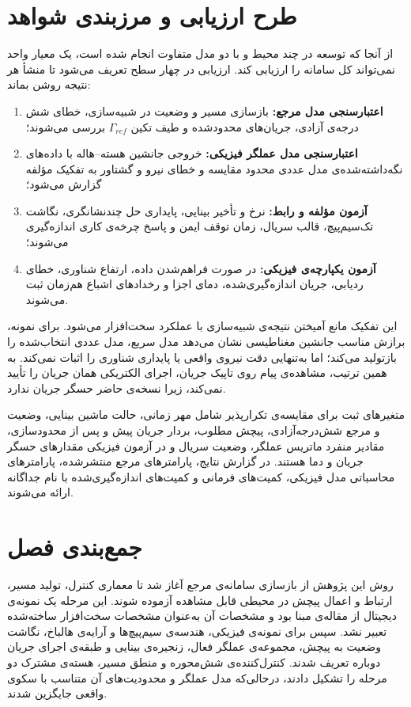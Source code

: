 \section{طرح ارزیابی و مرزبندی شواهد}
\label{sec:method-evaluation-plan}

از آنجا که توسعه در چند محیط و با دو مدل متفاوت انجام شده است، یک معیار واحد نمی‌تواند کل سامانه را ارزیابی کند. ارزیابی در چهار سطح تعریف می‌شود تا منشأ هر نتیجه روشن بماند:

\begin{enumerate}
	\item \textbf{اعتبارسنجی مدل مرجع:} بازسازی مسیر و وضعیت در شبیه‌سازی، خطای شش درجه‌ی آزادی، جریان‌های محدودشده و طیف تکین $\Gamma_{ref}$ بررسی می‌شوند؛
	\item \textbf{اعتبارسنجی مدل عملگر فیزیکی:} خروجی جانشین هسته--هاله با داده‌های نگه‌داشته‌شده‌ی مدل عددی محدود مقایسه و خطای نیرو و گشتاور به تفکیک مؤلفه گزارش می‌شود؛
	\item \textbf{آزمون مؤلفه و رابط:} نرخ و تأخیر بینایی، پایداری حل چندنشانگری، نگاشت تک‌سیم‌پیچ، قالب سریال، زمان توقف ایمن و پاسخ چرخه‌ی کاری اندازه‌گیری می‌شوند؛
	\item \textbf{آزمون یکپارچه‌ی فیزیکی:} در صورت فراهم‌شدن داده، ارتفاع شناوری، خطای ردیابی، جریان اندازه‌گیری‌شده، دمای اجزا و رخدادهای اشباع هم‌زمان ثبت می‌شوند.
\end{enumerate}

این تفکیک مانع آمیختن نتیجه‌ی شبیه‌سازی با عملکرد سخت‌افزار می‌شود. برای نمونه، برازش مناسب جانشین مغناطیسی نشان می‌دهد مدل سریع، مدل عددی انتخاب‌شده را بازتولید می‌کند؛ اما به‌تنهایی دقت نیروی واقعی یا پایداری شناوری را اثبات نمی‌کند. به همین ترتیب، مشاهده‌ی پیام روی تاپیک جریان، اجرای الکتریکی همان جریان را تأیید نمی‌کند، زیرا نسخه‌ی حاضر حسگر جریان ندارد.

متغیرهای ثبت برای مقایسه‌ی تکرارپذیر شامل مهر زمانی، حالت ماشین بینایی، وضعیت و مرجع شش‌درجه‌آزادی، پیچش مطلوب، بردار جریان پیش و پس از محدودسازی، مقادیر منفرد ماتریس عملگر، وضعیت سریال و در آزمون فیزیکی مقدارهای حسگر جریان و دما هستند. در گزارش نتایج، پارامترهای مرجع منتشرشده، پارامترهای محاسباتی مدل فیزیکی، کمیت‌های فرمانی و کمیت‌های اندازه‌گیری‌شده با نام جداگانه ارائه می‌شوند.

\section{جمع‌بندی فصل}
\label{sec:method-summary}

روش این پژوهش از بازسازی سامانه‌ی مرجع آغاز شد تا معماری کنترل، تولید مسیر، ارتباط  و اعمال پیچش در محیطی قابل مشاهده آزموده شوند. این مرحله یک نمونه‌ی دیجیتال از مقاله‌ی مبنا بود و مشخصات آن به‌عنوان مشخصات سخت‌افزار ساخته‌شده تعبیر نشد. سپس برای نمونه‌ی فیزیکی، هندسه‌ی سیم‌پیچ‌ها و آرایه‌ی هالباخ، نگاشت وضعیت به پیچش، مجموعه‌ی عملگر فعال، زنجیره‌ی بینایی و طبقه‌ی اجرای جریان دوباره تعریف شدند. کنترل‌کننده‌ی شش‌محوره و منطق مسیر، هسته‌ی مشترک دو مرحله را تشکیل دادند، درحالی‌که مدل عملگر و محدودیت‌های آن متناسب با سکوی واقعی جایگزین شدند.

